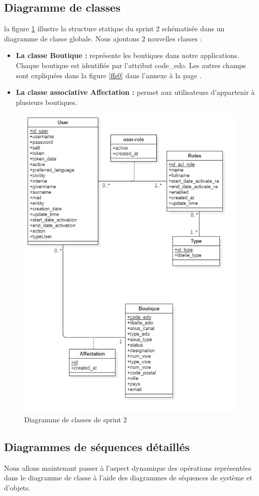\subsection{Diagramme de classes}
la figure \ref{fig:classdiag-sprint2} illustre la structure statique du sprint 2 schématisée dans un diagramme de classe globale.
Nous ajoutons 2 nouvelles classes :
\begin{itemize}
	\item \textbf{La classe Boutique :} représente les boutiques dans notre applications. Chaque boutique est identifiée par l'attribut code\_edo. Les autres champs sont expliquées dans la figure \ref{ffs0} dans l'annexe à la page \pageref{}.
	\item \textbf{La classe associative Affectation : } permet aux utilisateurs d'appartenir à plusieurs boutiques.
\end{itemize}
\begin{figure}[H]
	\centering
	\includegraphics[width=0.5\linewidth]{img/conception/classes/ClassDiag-sprint2}
	\caption[Diagramme de classes de sprint 2]{Diagramme de classes de sprint 2}
	\label{fig:classdiag-sprint2}
\end{figure}

\subsection{Diagrammes de séquences détaillés}
Nous allons maintenant passer à l’aspect dynamique des opérations représentées dans le diagramme de classe à l’aide des diagrammes de séquences de système et d’objets.
